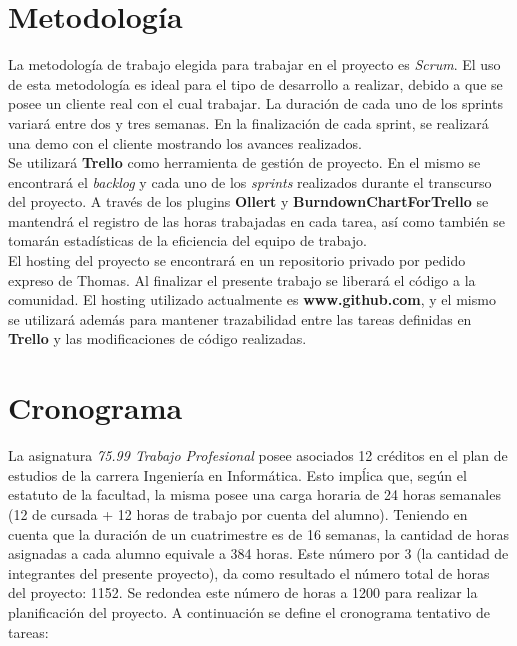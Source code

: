 \documentclass[a4paper,10pt]{article}
\begin{document}
    \newpage
    \section{Metodología}
        La metodología de trabajo elegida para trabajar en el proyecto es \textit{Scrum}. El uso de esta metodología es ideal para el tipo
        de desarrollo a realizar, debido a que se posee un cliente real con el cual trabajar. La duración de cada uno de
        los sprints variará entre dos y tres semanas. En la finalización de cada sprint, se realizará una demo con el cliente mostrando 
        los avances realizados. \\
        \indent Se utilizará \textbf{Trello} como herramienta de gestión de proyecto. En el mismo se encontrará el \textit{backlog} y
        cada uno de los \textit{sprints} realizados durante el transcurso del proyecto. A través de los plugins \textbf{Ollert} y
        \textbf{BurndownChartForTrello} se mantendrá el registro de las horas trabajadas en cada tarea, así como también se tomarán
        estadísticas de la eficiencia del equipo de trabajo. \\
        \indent El hosting del proyecto se encontrará en un repositorio privado por pedido expreso de Thomas. Al finalizar el presente
        trabajo se liberará el código a la comunidad. El hosting utilizado actualmente es \textbf{www.github.com}, y el mismo se utilizará
        además para mantener trazabilidad entre las tareas definidas en \textbf{Trello} y las modificaciones de código realizadas.



    \newpage
    \section{Cronograma}
        La asignatura \textit{75.99 Trabajo Profesional} posee asociados 12 créditos en el plan de estudios de la carrera Ingeniería en
        Informática. Esto impĺica que, según el estatuto de la facultad, la misma posee una carga horaria de 24 horas semanales (12 de
        cursada + 12 horas de trabajo por cuenta del alumno). Teniendo en cuenta que la duración de un cuatrimestre es de 16 semanas,
        la cantidad de horas asignadas a cada alumno equivale a 384 horas. Este número por 3 (la cantidad de integrantes del presente
        proyecto), da como resultado el número total de horas del proyecto: 1152. Se redondea este número de horas a 1200 para realizar
        la planificación del proyecto. A continuación se define el cronograma tentativo de tareas:
\end{document}
